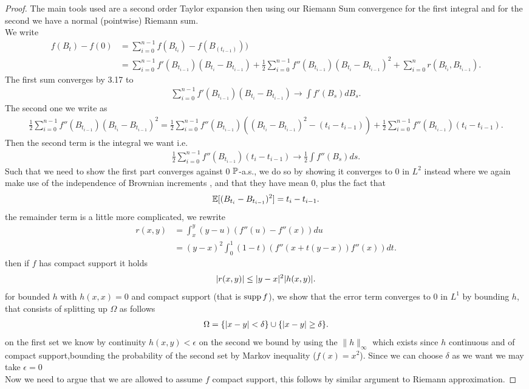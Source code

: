 \begin{proof}
 The main tools used are a second order Taylor expansion then using our Riemann Sum convergence for the first integral 
 and for the second we have a normal (pointwise) Riemann sum.\\
 We write 
 \begin{align*}
   f(B_t) - f(0) &= \sum_{i=0}^{n-1} f(B_{t_i})-f(B_(t_{i-1})))\\
                 &= \sum_{i=0}^{n-1} f'(B_{t_{i-1}})(B_{t_i}-B_{t_{i-1}}) + \frac{1}{2}\sum_{i=0}^{n-1} f''(B_{t_{i-1}})(B_{t_i}-B_{t_{i-1}})^2 + \sum_{i=0}^{n} r(B_{t_i},B_{t_{i-1}}) 
 .\end{align*}
 The first sum converges by 3.17  to 
 \begin{align*}
  \sum_{i=0}^{n-1} f'(B_{t_{i-1}})(B_{t_i}-B_{t_{i-1}}) \to  \int f'(B_s) dB_s
 .\end{align*}
 The second one we write as 
 \begin{align*}
   \frac{1}{2}\sum_{i=0}^{n-1} f''(B_{t_{i-1}})(B_{t_i}-B_{t_{i-1}})^2 = \frac{1}{2}\sum_{i=0}^{n-1} f''(B_{t_{i-1}})((B_{t_i}-B_{t_{i-1}})^2-(t_i-t_{i-1})) + \frac{1}{2}\sum_{i=0}^{n-1} f''(B_{t_{i-1}})(t_i-t_{i-1})
 .\end{align*}
 Then the second term is the integral we want i.e.
 \begin{align*}
   \frac{1}{2}\sum_{i=0}^{n-1} f''(B_{t_{i-1}})(t_i-t_{i-1}) \to  \frac{1}{2}\int f''(B_{s}) ds
 .\end{align*}
 Such that we need to show the first part converges against 0 $\P$-a.s., we do so by showing it converges to 0 in $L^2$ instead
 where we again make use of the independence of Brownian increments , and that they have mean 0, plus the fact that 
 \begin{align*}
   \E[(B_{t_i}-B_{t_{i-1}})^2] = t_i - t_{i-1}
 .\end{align*}
 the remainder term is a little more complicated, we rewrite 
 \begin{align*}
   r(x,y) &= \int_{x}^{y} (y-u)(f''(u)-f''(x)) du\\
          &= (y-x)^2 \int_0^{1} (1-t)(f''(x+t(y-x))f''(x))dt
 .\end{align*}
 then  if $f$ has compact support it holds 
 \begin{align*}
  \abs{r(x,y)} \le \abs{y-x}^2 \abs{h(x,y)}
 .\end{align*}
 for bounded $h$ with $h(x,x) = 0$ and compact support (that is $\supp f$),
 we show that the error term converges to 0 in $L^{1} $ by bounding $h$, that consists of splitting up $\Omega $ as follows
 \begin{align*}
  \Omega  = \{\abs{x-y} < \delta  \}  \cup \{\abs{x-y} \ge \delta \}  
 .\end{align*}
 on the first set we know by continuity $h(x,y) < \epsilon$ on the second we bound by using the $\|h\|_{\infty}$ which exists
 since $h$ continuous and of compact support,bounding the probability of the second set by Markov inequality ($f(x) = x^2$).
 Since we can choose $\delta $ as we want we may take $\epsilon=0$\\[1ex]
 Now we need to argue that we are allowed to assume $f$ compact support, this follows by similar argument to Riemann approximation.
\end{proof}
